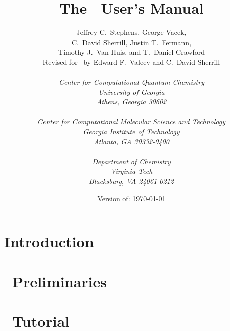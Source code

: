 \documentclass[12pt]{article}
\begin{document}


\title{\vspace{2.0in} {\bf The \PSIthree\ User's Manual}}

\author{Jeffrey C.~Stephens, George Vacek, \\
C.~David Sherrill, Justin T.~Fermann, \\
Timothy J.~Van Huis, and T.~Daniel Crawford \\
Revised for \PSIthree\ by Edward F.~Valeev  and C.~David Sherrill \\
\\
{\em Center for Computational Quantum Chemistry} \\
{\em University of Georgia} \\ 
{\em Athens, Georgia 30602} \\
\\
{\em Center for Computational Molecular Science and Technology} \\
{\em Georgia Institute of Technology} \\
{\em Atlanta, GA 30332-0400} \\
\\
{\em Department of Chemistry} \\
{\em Virginia Tech} \\
{\em Blacksburg, VA 24061-0212}
}

\date{Version of:  \today}
\maketitle
\thispagestyle{empty}

\newpage
\tableofcontents
\newpage

\section{Introduction} \label{introduction}


\section{\PSIthree\ Preliminaries} \label{preliminary}


\section{\PSIthree\ Tutorial} \label{tutorial}

\end{document}
